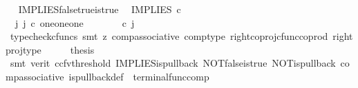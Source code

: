 \begin{isabellebody}
\isamarkupfalse%
%
\endisatagproof
{\isafoldproof}%
%
\isadelimproof
\ \isanewline
%
\endisadelimproof
\isanewline
{}\isamarkupfalse%
\ IMPLIES{\isacharunderscore}{\kern0pt}false{\isacharunderscore}{\kern0pt}true{\isacharunderscore}{\kern0pt}is{\isacharunderscore}{\kern0pt}true{\isacharcolon}{\kern0pt}\isanewline
\ \ {\isachardoublequoteopen}IMPLIES\ {\isasymcirc}\isactrlsub c\ {\isasymlangle}{\isasymf}{\isacharcomma}{\kern0pt}{\isasymt}{\isasymrangle}\ {\isacharequal}{\kern0pt}\ {\isasymt}{\isachardoublequoteclose}\isanewline
%
\isadelimproof
%
\endisadelimproof
%
\isatagproof
{}\isamarkupfalse%
\ {\isacharminus}{\kern0pt}\ \ \ \isanewline
\ \ \isamarkupfalse%
\ {\isachardoublequoteopen}{\isasymexists}\ j{\isachardot}{\kern0pt}\ j\ {\isasymin}\isactrlsub c\ one{\isasymCoprod}{\isacharparenleft}{\kern0pt}one{\isasymCoprod}one{\isacharparenright}{\kern0pt}\ {\isasymand}\ {\isacharparenleft}{\kern0pt}{\isasymlangle}{\isasymt}{\isacharcomma}{\kern0pt}\ {\isasymt}{\isasymrangle}{\isasymamalg}\ {\isacharparenleft}{\kern0pt}{\isasymlangle}{\isasymf}{\isacharcomma}{\kern0pt}\ {\isasymf}{\isasymrangle}\ {\isasymamalg}{\isasymlangle}{\isasymf}{\isacharcomma}{\kern0pt}\ {\isasymt}{\isasymrangle}{\isacharparenright}{\kern0pt}{\isacharparenright}{\kern0pt}\ {\isasymcirc}\isactrlsub c\ j\ \ {\isacharequal}{\kern0pt}\ {\isasymlangle}{\isasymf}{\isacharcomma}{\kern0pt}{\isasymt}{\isasymrangle}{\isachardoublequoteclose}\isanewline
\ \ \ \ \isamarkupfalse%
\ {\isacharparenleft}{\kern0pt}typecheck{\isacharunderscore}{\kern0pt}cfuncs{\isacharcomma}{\kern0pt}\ smt\ {\isacharparenleft}{\kern0pt}z{}{\isacharparenright}{\kern0pt}\ comp{\isacharunderscore}{\kern0pt}associative{}\ comp{\isacharunderscore}{\kern0pt}type\ right{\isacharunderscore}{\kern0pt}coproj{\isacharunderscore}{\kern0pt}cfunc{\isacharunderscore}{\kern0pt}coprod\ right{\isacharunderscore}{\kern0pt}proj{\isacharunderscore}{\kern0pt}type{\isacharparenright}{\kern0pt}\isanewline
\ \ \isamarkupfalse%
\ \isamarkupfalse%
\ {\isacharquery}{\kern0pt}thesis\isanewline
\ \ \ \ \isamarkupfalse%
\ {\isacharparenleft}{\kern0pt}smt\ {\isacharparenleft}{\kern0pt}verit{\isacharcomma}{\kern0pt}\ ccfv{\isacharunderscore}{\kern0pt}threshold{\isacharparenright}{\kern0pt}\ IMPLIES{\isacharunderscore}{\kern0pt}is{\isacharunderscore}{\kern0pt}pullback\ NOT{\isacharunderscore}{\kern0pt}false{\isacharunderscore}{\kern0pt}is{\isacharunderscore}{\kern0pt}true\ NOT{\isacharunderscore}{\kern0pt}is{\isacharunderscore}{\kern0pt}pullback\ comp{\isacharunderscore}{\kern0pt}associative{}\ is{\isacharunderscore}{\kern0pt}pullback{\isacharunderscore}{\kern0pt}def\ \ terminal{\isacharunderscore}{\kern0pt}func{\isacharunderscore}{\kern0pt}comp{\isacharparenright}{\kern0pt}\isanewline

\end{isabellebody}
